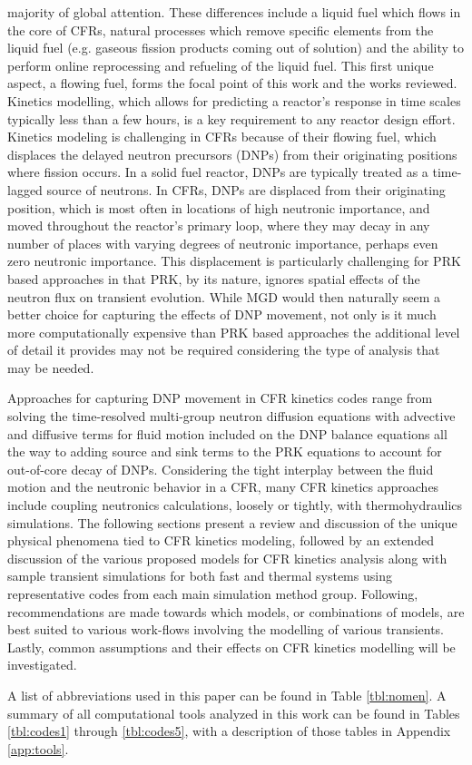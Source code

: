 \documentclass[review]{elsarticle}
\begin{document}
majority of global attention. These differences include a liquid fuel
 which flows in the core of CFRs, natural processes which remove specific elements from
 the liquid fuel (e.g. gaseous fission products coming out of solution)
and the ability to perform online reprocessing and refueling of the liquid fuel.
 This first unique aspect, a flowing fuel, forms the focal point of this work and the
  works reviewed. Kinetics modelling, which allows for predicting
a reactor's response in time scales typically less than a few hours, is a key
requirement to any reactor design effort. Kinetics modeling is challenging in CFRs
because of their flowing fuel, which displaces the delayed neutron precursors
 (DNPs) from their originating positions where fission occurs. In a solid fuel
reactor, DNPs are typically treated as a time-lagged source of neutrons.
In CFRs, DNPs are displaced from their originating position, which is 
most often in locations
of high neutronic importance, and moved throughout the reactor's primary loop,
where they may decay in any number of places with varying degrees of
neutronic importance, perhaps even zero neutronic importance. This
displacement is particularly challenging for PRK based approaches
in that PRK, by its nature, ignores spatial effects of the
neutron flux on transient evolution. While MGD would then naturally
seem a better choice for capturing the effects of DNP movement, not
only is it much more computationally expensive than PRK based approaches
the additional level of detail it provides may not be required considering
the type of analysis that may be needed. 
\par Approaches for capturing DNP movement in CFR kinetics codes 
range from solving the 
time-resolved multi-group neutron diffusion equations with advective and
diffusive terms for fluid motion included on the DNP balance equations
all the way to adding
source and sink terms to the PRK equations to account
for out-of-core decay of DNPs. Considering the tight interplay between the
fluid motion and the neutronic behavior in a CFR, many CFR kinetics approaches
include coupling neutronics calculations, loosely or tightly, 
with thermohydraulics simulations. The
following sections present a review and discussion of the
unique physical phenomena tied to CFR kinetics modeling, 
followed by an extended discussion of the various proposed models for CFR
kinetics analysis along with sample transient simulations for
both fast and thermal systems using representative codes from each main
simulation method group. Following, recommendations are made towards
which models, or combinations of models, are best suited to various
work-flows involving the modelling of various transients.
 Lastly, common assumptions and their effects on CFR
kinetics modelling will be investigated.
\par A list of abbreviations used in this paper can be found in Table
\ref{tbl:nomen}. A summary of all computational tools analyzed
in this work can be found in Tables \ref{tbl:codes1} through \ref{tbl:codes5},
 with a description of those tables in Appendix \ref{app:tools}.
\end{document}

